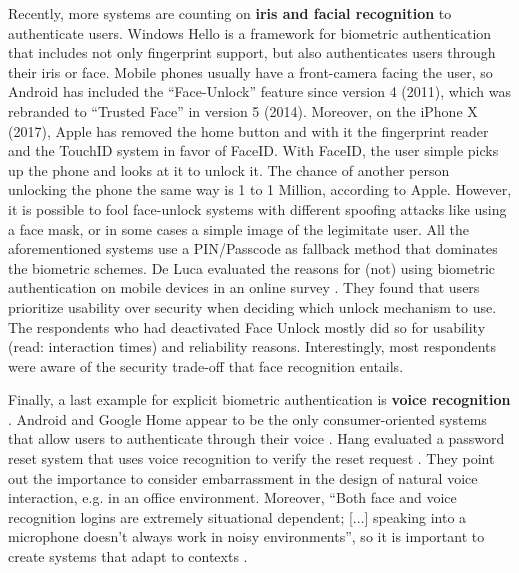	Recently, more systems are counting on \textbf{iris and facial recognition} to authenticate users. Windows Hello is a framework for biometric authentication that includes not only fingerprint support, but also authenticates users through their iris or face. Mobile phones usually have a front-camera facing the user, so Android has included the ``Face-Unlock'' feature since version 4 (2011), which was rebranded to ``Trusted Face'' in version 5 (2014). Moreover, on the iPhone X (2017), Apple has removed the home button and with it the fingerprint reader and the TouchID system in favor of FaceID. With FaceID, the user simple picks up the phone and looks at it to unlock it. The chance of another person unlocking the phone the same way is 1 to 1 Million, according to Apple. 
	However, it is possible to fool face-unlock systems with different spoofing attacks like using a face mask, or in some cases a simple image of the legimitate user. All the aforementioned systems use a PIN/Passcode as fallback method that dominates the biometric schemes. 
	De Luca \etal evaluated the reasons for (not) using biometric authentication on mobile devices in an online survey \cite{DeLuca2015Selfies}. They found that users prioritize usability over security when deciding which unlock mechanism to use. The respondents who had deactivated Face Unlock mostly did so for usability (read: interaction times) and reliability reasons. Interestingly, most respondents were aware of the security trade-off that face recognition entails.
	
	Finally, a last example for explicit biometric authentication is \textbf{voice recognition} \cite{Aleksic2006AVBiometrics}. Android and Google Home appear to be the only consumer-oriented systems that allow users to authenticate through their voice \ar. Hang \etal evaluated a password reset system that uses voice recognition to verify the reset request \cite{Hang2013TravelRoutes}. They point out the importance to consider embarrassment in the design of natural voice interaction, e.g. in an office environment. Moreover, ``Both face and voice recognition logins are extremely situational dependent; [...] speaking into a microphone doesn't always work in noisy environments'', so it is important to create systems that adapt to contexts \cite{Damousis2008Humabio}.
	
